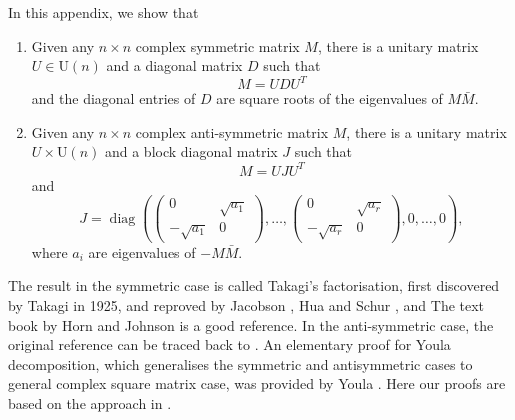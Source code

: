 \documentclass[11pt, a4paper]{article}
\numberwithin{equation}{section}
\newcommand{\Unitary}{\mathrm{U}}
\DeclareMathOperator{\diag}{diag}
\theoremstyle{definition}
\theoremstyle{remark}
\begin{document}
In this appendix, we show that
\begin{enumerate}
\item
  Given any $n \times n$ complex symmetric matrix $M$, there is a unitary matrix $U \in \Unitary(n)$ and a diagonal matrix $D$ such that
  \begin{equation}
    M = U D U^T
  \end{equation}
  and the diagonal entries of $D$ are square roots of the eigenvalues of $M \bar{M}$.
\item
  Given any $n \times n$ complex anti-symmetric matrix $M$, there is a unitary matrix $U \times \Unitary(n)$ and a block diagonal matrix $J$ such that
  \begin{equation}
    M = U J U^T
  \end{equation}
  and
  \begin{equation}
    J = \diag(
    \begin{pmatrix}
      0 & \sqrt{a_1} \\
      -\sqrt{a_1} & 0
    \end{pmatrix},
    \dotsc,
    \begin{pmatrix}
      0 & \sqrt{a_r} \\
      -\sqrt{a_r} & 0
    \end{pmatrix},
    0, \dotsc, 0),
  \end{equation}
  where $a_i$ are eigenvalues of $-M \bar{M}$.
\end{enumerate}
The result in the symmetric case is called Takagi's factorisation, first discovered by Takagi \cite{Takagi24} in 1925, and reproved by Jacobson \cite{Jacobson39}, Hua \cite{Hua44} and Schur \cite{Schur45}, and The text book \cite{Horn-Johnson90} by Horn and Johnson is a good reference. In the anti-symmetric case, the original reference can be traced back to \cite{Hua44}. An elementary proof for Youla decomposition, which generalises the symmetric and antisymmetric cases to general complex square matrix case, was provided by Youla \cite{Youla61}. Here our proofs are based on the approach in \cite[Section 4.4]{Horn-Johnson90}.
\end{document}
